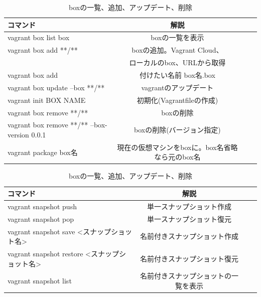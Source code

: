 \begin{table}[htb]
	\begin{center}
		 \caption{boxの一覧、追加、アップデート、削除}
 			\begin{tabular}{|l|c|r||r|} \hline
				コマンド & 解説  \\ \hline \hline
				vagrant box list box& boxの一覧を表示  \\ \hline
				vagrant box add **/** & boxの追加。Vagrant Cloud、\\ & ローカルのbox、URLから取得  \\ \hline
				vagrant box add　& 付けたい名前 box名.box  \\ \hline
				vagrant box update --box **/** & vagrantのアップデート  \\ \hline
				vagrant init BOX NAME & 初期化(Vagrantfileの作成)  \\ \hline
				vagrant box remove **/** & boxの削除  \\ \hline
				vagrant box remove **/** --box-version 0.0.1 & boxの削除(バージョン指定)  \\ \hline
				vagrant package box名 & 現在の仮想マシンをboxに。box名省略なら元のbox名  \\ \hline
			\end{tabular}
	 \end{center}
\end{table}

\begin{table}[htb]
	\begin{center}
		 \caption{boxの一覧、追加、アップデート、削除}
 			\begin{tabular}{|l|c|r||r|} \hline
				コマンド & 解説  \\ \hline \hline
				vagrant snapshot push & 単一スナップショット作成  \\ \hline
				vagrant snapshot pop & 単一スナップショット復元  \\ \hline
				vagrant snapshot save <スナップショット名> & 名前付きスナップショット作成  \\ \hline
				vagrant snapshot restore <スナップショット名> & 名前付きスナップショット復元  \\ \hline
				vagrant snapshot list & 名前付きスナップショットの一覧を表示  \\ \hline
			\end{tabular}
	 \end{center}
\end{table}

